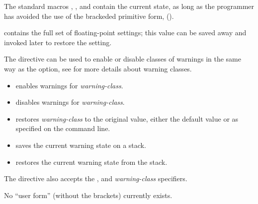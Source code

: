 The standard macros ,
, and  contain
the current state, as long as the programmer has avoided the use
of the brackeded primitive form, (\code{[FLOAT]}).

 contains the full set of floating-point settings;
this value can be saved away and invoked later to restore the setting.


The \code{[WARNING]} directive can be used to enable or disable classes
of warnings in the same way as the  option, see 
for more details about warning classes.

\begin{itemize}
    \item{ enables warnings for
        \emph{warning-class}}.

    \item{ disables warnings for
        \emph{warning-class}}.

    \item{ restores \emph{warning-class} to
        the original value, either the default value or as specified on the
        command line.}

    \item{ saves the current warning state on a stack.}

    \item{ restores the current warning state from the stack.}
\end{itemize}

The \code{[WARNING]} directive also accepts the ,  and
\emph{warning-class} specifiers.

No ``user form'' (without the brackets) currently exists.
